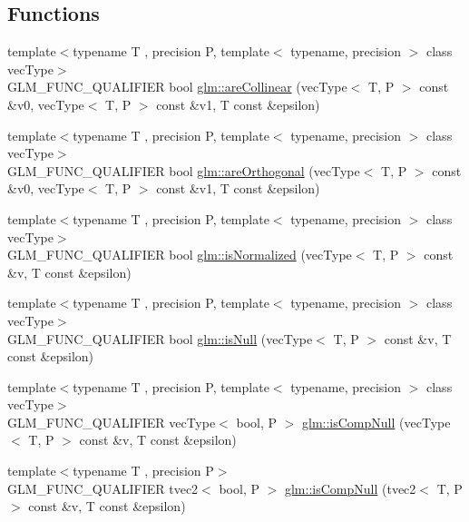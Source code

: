 \subsection*{Functions}
\begin{DoxyCompactItemize}
\item 
{\footnotesize template$<$typename T , precision P, template$<$ typename, precision $>$ class vec\+Type$>$ }\\G\+L\+M\+\_\+\+F\+U\+N\+C\+\_\+\+Q\+U\+A\+L\+I\+F\+I\+E\+R bool \hyperlink{group__gtx__vector__query_ga465b844190d1740051e45d780832ea4c}{glm\+::are\+Collinear} (vec\+Type$<$ T, P $>$ const \&v0, vec\+Type$<$ T, P $>$ const \&v1, T const \&epsilon)
\item 
{\footnotesize template$<$typename T , precision P, template$<$ typename, precision $>$ class vec\+Type$>$ }\\G\+L\+M\+\_\+\+F\+U\+N\+C\+\_\+\+Q\+U\+A\+L\+I\+F\+I\+E\+R bool \hyperlink{group__gtx__vector__query_gaee10acefed397c11e01f2862e837754c}{glm\+::are\+Orthogonal} (vec\+Type$<$ T, P $>$ const \&v0, vec\+Type$<$ T, P $>$ const \&v1, T const \&epsilon)
\item 
{\footnotesize template$<$typename T , precision P, template$<$ typename, precision $>$ class vec\+Type$>$ }\\G\+L\+M\+\_\+\+F\+U\+N\+C\+\_\+\+Q\+U\+A\+L\+I\+F\+I\+E\+R bool \hyperlink{group__gtx__vector__query_ga6fa5fa2af67d14c205d24c49aad03270}{glm\+::is\+Normalized} (vec\+Type$<$ T, P $>$ const \&v, T const \&epsilon)
\item 
{\footnotesize template$<$typename T , precision P, template$<$ typename, precision $>$ class vec\+Type$>$ }\\G\+L\+M\+\_\+\+F\+U\+N\+C\+\_\+\+Q\+U\+A\+L\+I\+F\+I\+E\+R bool \hyperlink{group__gtx__vector__query_ga81a64edc1a2b470b82896592e89c523b}{glm\+::is\+Null} (vec\+Type$<$ T, P $>$ const \&v, T const \&epsilon)
\item 
{\footnotesize template$<$typename T , precision P, template$<$ typename, precision $>$ class vec\+Type$>$ }\\G\+L\+M\+\_\+\+F\+U\+N\+C\+\_\+\+Q\+U\+A\+L\+I\+F\+I\+E\+R vec\+Type$<$ bool, P $>$ \hyperlink{group__gtx__vector__query_ga93ecd4137480483ce1af0de8bbbf6546}{glm\+::is\+Comp\+Null} (vec\+Type$<$ T, P $>$ const \&v, T const \&epsilon)
\item 
{\footnotesize template$<$typename T , precision P$>$ }\\G\+L\+M\+\_\+\+F\+U\+N\+C\+\_\+\+Q\+U\+A\+L\+I\+F\+I\+E\+R tvec2$<$ bool, P $>$ \hyperlink{namespaceglm_afc1ffd2beb09bb3c683b3606b2540519}{glm\+::is\+Comp\+Null} (tvec2$<$ T, P $>$ const \&v, T const \&epsilon)

\end{DoxyCompactItemize}
